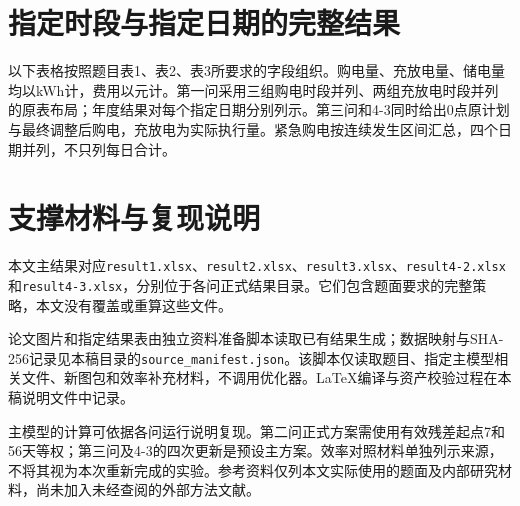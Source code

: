 \section{指定时段与指定日期的完整结果}\label{sec:outputs}
以下表格按照题目表1、表2、表3所要求的字段组织。购电量、充放电量、储电量均以kWh计，费用以元计。第一问采用三组购电时段并列、两组充放电时段并列的原表布局；年度结果对每个指定日期分别列示。第三问和4-3同时给出0点原计划与最终调整后购电，充放电为实际执行量。紧急购电按连续发生区间汇总，四个日期并列，不只列每日合计。


\FloatBarrier
\section{支撑材料与复现说明}
本文主结果对应\texttt{result1.xlsx}、\texttt{result2.xlsx}、\texttt{result3.xlsx}、\texttt{result4-2.xlsx}和\texttt{result4-3.xlsx}，分别位于各问正式结果目录。它们包含题面要求的完整策略，本文没有覆盖或重算这些文件。

论文图片和指定结果表由独立资料准备脚本读取已有结果生成；数据映射与SHA-256记录见本稿目录的\texttt{source\_manifest.json}。该脚本仅读取题目、指定主模型相关文件、新图包和效率补充材料，不调用优化器。LaTeX编译与资产校验过程在本稿说明文件中记录。

主模型的计算可依据各问运行说明复现。第二问正式方案需使用有效残差起点7和56天等权；第三问及4-3的四次更新是预设主方案。效率对照材料单独列示来源，不将其视为本次重新完成的实验。参考资料仅列本文实际使用的题面及内部研究材料，尚未加入未经查阅的外部方法文献。
